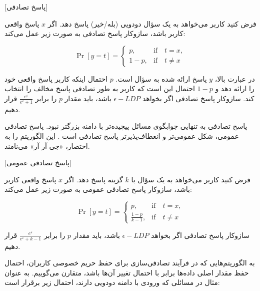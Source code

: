 [پاسخ تصادفی]

فرض کنید کاربر می‌خواهد به یک سؤال دودویی (بله/خیر) پاسخ دهد. اگر $x$ پاسخ واقعی کاربر باشد، سازوکار پاسخ تصادفی به صورت زیر عمل می‌کند:

\begin{equation}
\Pr[y = t] = 
\begin{cases} 
p, & \text{if} \quad t = x, \\[10pt]
1-p, & \text{if} \quad t \neq x
\end{cases}
\end{equation}


در عبارت بالا، $y$ پاسخ ارائه شده به سؤال است. $p$ احتمال اینکه کاربر پاسخ واقعی خود را ارائه دهد و $1{-}p$ احتمال این است که کاربر به طور تصادفی پاسخ مخالف را انتخاب کند. سازوکار پاسخ تصادفی اگر بخواهد $\epsilon{-}LDP$ باشد، باید مقدار $p$ را برابر $\frac{e^{\varepsilon}}{e^{\varepsilon}+1}$ قرار دهیم.


پاسخ تصادفی به تنهایی جوابگوی مسائل پیچیده‌تر با دامنه بزرگتر نبود. پاسخ تصادفی عمومی، شکل عمومی‌تر و انعطاف‌پذیرتر پاسخ تصادفی است . این الگوریتم را به اختصار، «جی آر آر» می‌نامند.

[پاسخ تصادفی عمومی]

فرض کنید کاربر می‌خواهد به یک سؤال با $k$ گزینه پاسخ دهد. اگر $x$ پاسخ واقعی کاربر باشد، سازوکار پاسخ تصادفی عمومی به صورت زیر عمل می‌کند:

\begin{equation}
\Pr[y = t] = 
\begin{cases} 
p, & \text{if} \quad t = x, \\[10pt]
\frac{1 - p}{k - 1}, & \text{if} \quad t \neq x
\end{cases}
\label{equ:GRR}
\end{equation}


سازوکار پاسخ تصادفی اگر بخواهد $\epsilon{-}LDP$ باشد، باید مقدار $p$ را برابر $\frac{e^{\varepsilon}}{e^{\varepsilon}+k-1}$ قرار دهیم.



به الگوریتم‌هایی که در فرآیند تصادفی‌سازی برای حفظ حریم خصوصی کاربران، احتمال حفظ مقدار اصلی داده‌ها برابر با احتمال تغییر آن‌ها باشد، متقارن می‌گوییم. به عنوان مثال در مسائلی که ورودی با دامنه دودویی دارند، احتمال زیر برقرار است:

